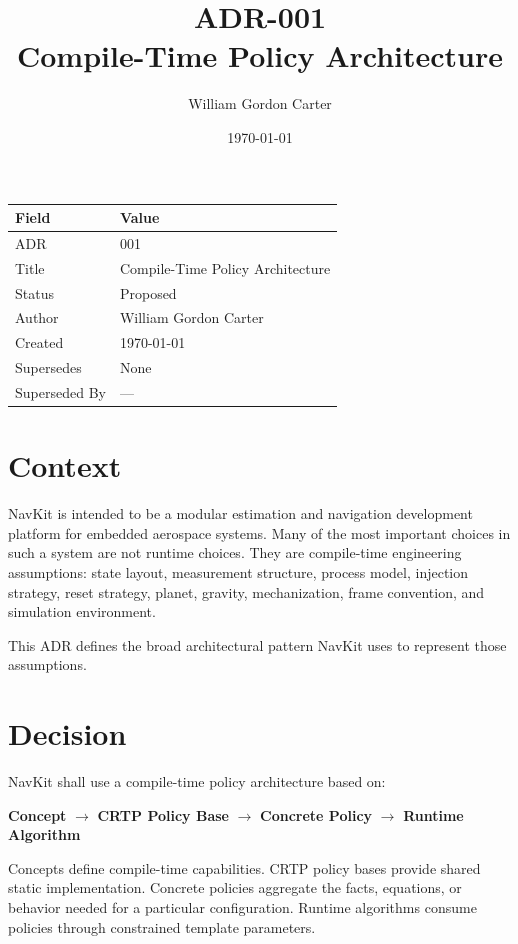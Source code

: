 \documentclass[11pt]{article}
\title{ADR-001\\Compile-Time Policy Architecture}
\author{William Gordon Carter}
\date{\today}
\begin{document}
\maketitle

\begin{center}
\begin{tabular}{ll}
\toprule
\textbf{Field} & \textbf{Value} \\
\midrule
ADR & 001 \\
Title & Compile-Time Policy Architecture \\
Status & Proposed \\
Author & William Gordon Carter \\
Created & \today \\
Supersedes & None \\
Superseded By & --- \\
\bottomrule
\end{tabular}
\end{center}

\tableofcontents
\newpage

\section{Context}

NavKit is intended to be a modular estimation and navigation development
platform for embedded aerospace systems. Many of the most important choices in
such a system are not runtime choices. They are compile-time engineering
assumptions: state layout, measurement structure, process model, injection
strategy, reset strategy, planet, gravity, mechanization, frame convention, and
simulation environment.

This ADR defines the broad architectural pattern NavKit uses to represent
those assumptions.

\section{Decision}

NavKit shall use a compile-time policy architecture based on:

\begin{center}
\textbf{Concept} $\rightarrow$ \textbf{CRTP Policy Base} $\rightarrow$
\textbf{Concrete Policy} $\rightarrow$ \textbf{Runtime Algorithm}
\end{center}

Concepts define compile-time capabilities. CRTP policy bases provide shared
static implementation. Concrete policies aggregate the facts, equations, or
behavior needed for a particular configuration. Runtime algorithms consume
policies through constrained template parameters.
\end{document}
